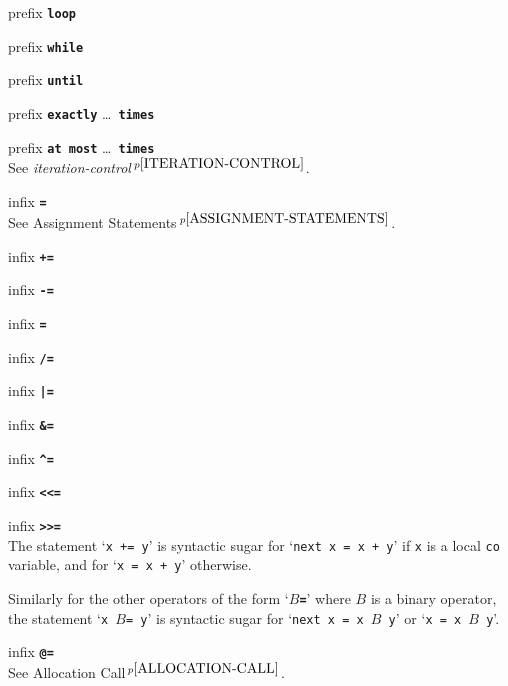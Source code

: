 \documentclass[12pt]{article}
\newcommand{\TT}[1]{{\tt \bfseries #1}}
\newcommand{\pagnote}[1]{$\,^{p\pageref{#1}}$}
\newenvironment{itemlist}[1][1.2in]%
	{\begin{list}{}{\setlength{\labelwidth}{#1}%
		        \setlength{\leftmargin}{\labelwidth}%
		        \addtolength{\leftmargin}{+0.2in}%
		        \renewcommand{\makelabel}[1]{##1\hfill}}}%
	{\end{list}}
\begin{document}
\begin{itemlist}[0.2in]
\item[prefix \TT{loop}]
\item[prefix \TT{while}] \vspace*{-0.15in}
\item[prefix \TT{until}] \vspace*{-0.15in}
\item[prefix \TT{exactly} \ldots{}~\TT{times}] \vspace*{-0.15in}
\item[prefix \TT{at most} \ldots{}~\TT{times}] \vspace*{-0.15in} ~\\
See {\em iteration-control}\pagnote{ITERATION-CONTROL}.

\item[infix \TT{=}] ~\\
See Assignment Statements\pagnote{ASSIGNMENT-STATEMENTS}.

\item[infix \TT{+=}]
\item[infix \TT{-=}] \vspace*{-0.15in}
\item[infix \TT{*=}] \vspace*{-0.15in}
\item[infix \TT{/=}] \vspace*{-0.15in}
\item[infix \TT{|=}] \vspace*{-0.15in}
\item[infix \TT{\&=}] \vspace*{-0.15in}
\item[infix \TT{\textasciicircum=}] \vspace*{-0.15in}
\item[infix \TT{<{}<{}=}] \vspace*{-0.15in}
\item[infix \TT{>{}>{}=}] \vspace*{-0.15in} ~\\
The statement `{\tt x += y}' is syntactic sugar for `{\tt next x = x + y}'
if {\tt x} is a local {\tt co} variable, and for
`{\tt x = x + y}' otherwise.

Similarly for the other operators of the form `\TT{$B$=}'
where $B$ is a binary operator,
the statement `{\tt x $B$= y}' is syntactic sugar for
`{\tt next x = x $B$ y}' or `{\tt x = x $B$ y}'.

\item[infix \TT{@=}] ~\\
See Allocation Call\pagnote{ALLOCATION-CALL}.


\end{itemlist}
\end{document}
